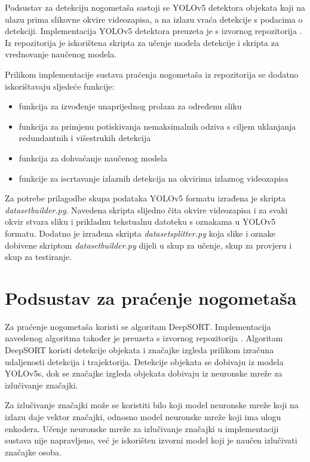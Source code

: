 \documentclass[times, utf8, seminar, numeric]{fer}
\begin{document}
Podsustav za detekciju nogometaša sastoji se YOLOv5 detektora objekata koji na ulazu prima slikovne okvire videozapisa, a na izlazu vraća detekcije s podacima o detekciji. 
Implementacija YOLOv5 detektora preuzeta je s izvornog repozitorija \cite{yolov5impl}. Iz repozitorija je iskorištena skripta za učenje modela detekcije i skripta za vrednovanje naučenog modela. 

Prilikom implementacije sustava praćenja nogometaša iz repozitorija se dodatno iskorištavaju sljedeće funkcije:
\begin{itemize}
	\item funkcija za izvođenje unaprijednog prolaza za određenu sliku
	\item funkcija za primjenu potiskivanja nemaksimalnih odziva s ciljem uklanjanja redundantnih i višestrukih detekcija
	\item funkcija za dohvaćanje naučenog modela
	\item funkcije za iscrtavanje izlaznih detekcija na okvirima izlaznog videozapisa 
\end{itemize}


Za potrebe prilagodbe skupa podataka YOLOv5 formatu izrađena je skripta \textit{dataset\textunderscore builder.py}. Navedena skripta slijedno čita okvire videozapisa i za svaki okvir stvara sliku i prikladnu tekstualnu datoteku s oznakama u YOLOv5 formatu. 
Dodatno je izrađena skripta \textit{dataset\textunderscore splitter.py} koja slike i oznake dobivene skriptom \textit{dataset\textunderscore builder.py} dijeli u skup za učenje, skup za provjeru i skup za testiranje.

\section{Podsustav za praćenje nogometaša}

Za praćenje nogometaša koristi se algoritam DeepSORT. 
Implementacija navedenog algoritma također je preuzeta s izvornog repozitorija \cite{Wojke2018deep}\cite{deepsort}. 
Algoritam DeepSORT koristi detekcije objekata i značajke izgleda prilikom izračuna udaljenosti detekcija i trajektorija. Detekcije objekata se dobivaju iz modela YOLOv5s, dok se značajke izgleda objekata dobivaju iz neuronske mreže za izlučivanje značajki.

Za izlučivanje značajki može se koristiti bilo koji model neuronske mreže koji na izlazu daje vektor značajki, odnosno model neuronske mreže koji ima ulogu enkodera. Učenje neuronske mreže za izlučivanje značajki u implementaciji sustava nije napravljeno, već je iskorišten izvorni model koji je naučen izlučivati značajke osoba.
\end{document}
